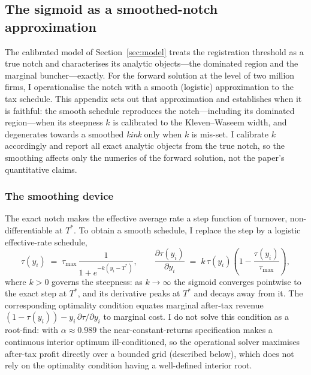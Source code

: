 \subsection{The sigmoid as a smoothed-notch approximation}
\label{app:notch}

The calibrated model of Section~\ref{sec:model} treats the registration
threshold as a true notch and characterises its analytic objects---the
dominated region and the marginal buncher---exactly. For the forward solution at
the level of two million firms, I operationalise the notch with a smooth
(logistic) approximation to the tax schedule. This appendix sets out that
approximation and establishes when it is faithful: the smooth schedule
reproduces the notch---including its dominated region---when its steepness $k$ is
calibrated to the Kleven--Waseem width, and degenerates towards a smoothed
\emph{kink} only when $k$ is mis-set. I calibrate $k$ accordingly and report all
exact analytic objects from the true notch, so the smoothing affects only the
numerics of the forward solution, not the paper's quantitative claims.

\subsubsection*{The smoothing device}

The exact notch makes the effective average rate a step function of turnover,
non-differentiable at $T^{*}$. To obtain a smooth schedule, I replace the step
by a logistic effective-rate schedule,
\begin{equation}
  \tau(y_i) \;=\; \tau_{\max}\,\frac{1}{1+e^{-k(y_i - T^{*})}},
  \qquad
  \frac{\partial \tau(y_i)}{\partial y_i}
  \;=\; k\,\tau(y_i)\!\left(1-\frac{\tau(y_i)}{\tau_{\max}}\right),
  \label{eq:tau-smooth}
\end{equation}
where $k>0$ governs the steepness: as $k\to\infty$ the sigmoid converges
pointwise to the exact step at $T^{*}$, and its derivative peaks at $T^{*}$ and
decays away from it. The corresponding optimality condition equates marginal
after-tax revenue $(1-\tau(y_i))-y_i\,\partial\tau/\partial y_i$ to marginal cost.
I do not solve this condition as a root-find: with $\alpha\approx0.989$ the
near-constant-returns specification makes a continuous interior optimum
ill-conditioned, so the operational solver maximises after-tax profit directly
over a bounded grid (described below), which does not rely on the optimality
condition having a well-defined interior root.

